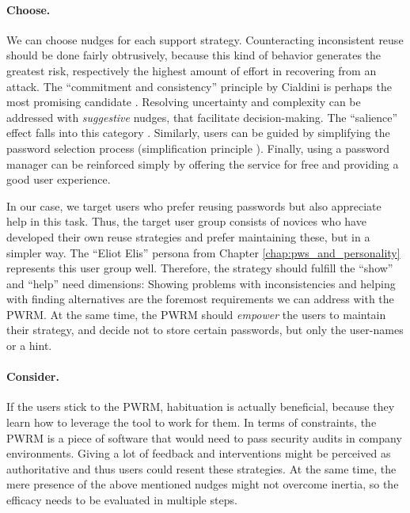 \paragraph{Choose.} We can choose nudges for each support strategy. Counteracting inconsistent reuse should be done fairly obtrusively, because this kind of behavior generates the greatest risk, respectively the highest amount of effort in recovering from an attack. The ``commitment and consistency'' principle by Cialdini is perhaps the most promising candidate \cite{Cialdini2007Influence}. Resolving uncertainty and complexity can be addressed with \textit{suggestive} nudges, that facilitate decision-making. The ``salience'' effect falls into this category \cite{Coventry2014SCENEBehavioralNudges}. Similarly, users can be guided by simplifying the password selection process (simplification principle \cite{Forget2007PersuasionEducationSecurity}). Finally, using a password manager can be reinforced simply by offering the service for free and providing a good user experience. 

In our case, we target users who prefer reusing passwords but also appreciate help in this task. Thus, the target user group consists of novices who have developed their own reuse strategies and prefer maintaining these, but in a simpler way. The ``Eliot Elis'' persona from Chapter \ref{chap:pws_and_personality} represents this user group well. Therefore, the strategy should fulfill the ``show'' and ``help'' need dimensions: Showing problems with inconsistencies and helping with finding alternatives are the foremost requirements we can address with the PWRM. At the same time, the PWRM should \textit{empower} the users to maintain their strategy, and decide not to store certain passwords, but only the user-names or a hint. 

\paragraph{Consider.}
If the users stick to the PWRM, habituation is actually beneficial, because they learn how to leverage the tool to work for them. In terms of constraints, the PWRM is a piece of software that would need to pass security audits in company environments. Giving a lot of feedback and interventions might be perceived as authoritative and thus users could resent these strategies. At the same time, the mere presence of the above mentioned nudges might not overcome inertia, so the efficacy needs to be evaluated in multiple steps. 

